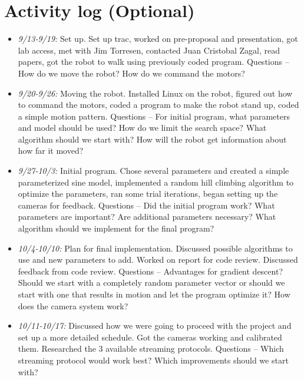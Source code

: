 \section{Activity log (Optional)}


\begin{itemize}
\item \emph{9/13-9/19:} Set up. Set up trac, worked on pre-proposal
  and presentation, got lab access, met with Jim Torresen, contacted
  Juan Cristobal Zagal, read papers, got the robot to walk using
  previously coded program. Questions -- How do we move the robot? How
  do we command the motors?
\item \emph{9/20-9/26:} Moving the robot. Installed Linux on the
  robot, figured out how to command the motors, coded a program to
  make the robot stand up, coded a simple motion pattern. Questions --
  For initial program, what parameters and model should be used? How
  do we limit the search space? What algorithm should we start with?
  How will the robot get information about how far it moved?
\item \emph{9/27-10/3:} Initial program. Chose several parameters and
  created a simple parameterized sine model, implemented a random hill
  climbing algorithm to optimize the parameters, ran some trial
  iterations, began setting up the cameras for feedback. Questions --
  Did the initial program work? What parameters are important? Are
  additional parameters necessary? What algorithm should we implement
  for the final program?
\item \emph{10/4-10/10:} Plan for final implementation. Discussed
  possible algorithms to use and new parameters to add. Worked on
  report for code review. Discussed feedback from code review.  Questions -- Advantages for gradient
  descent? Should we start with a completely random parameter vector
  or should we start with one that results in motion and let the
  program optimize it? How does the camera system work?
\item \emph{10/11-10/17:} Discussed how we were going to proceed with the project and set up a more detailed schedule. Got the cameras working and calibrated them. Researched the 3 available streaming protocols. Questions -- Which streaming protocol would work best? Which improvements should we start with?

\end{itemize}
